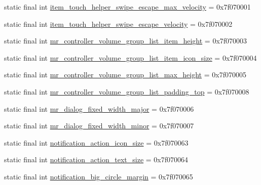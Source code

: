 \begin{CompactItemize}
\item 
static final int \hyperlink{classandroid_1_1support_1_1v7_1_1recyclerview_1_1_r_1_1dimen_744306f95c3c9e0ad3e85058a85fcd1d}{item\_\-touch\_\-helper\_\-swipe\_\-escape\_\-max\_\-velocity} = 0x7f070001
\item 
static final int \hyperlink{classandroid_1_1support_1_1v7_1_1recyclerview_1_1_r_1_1dimen_8ed36175a586aa30408abfcdcbc1035c}{item\_\-touch\_\-helper\_\-swipe\_\-escape\_\-velocity} = 0x7f070002
\item 
static final int \hyperlink{classandroid_1_1support_1_1v7_1_1recyclerview_1_1_r_1_1dimen_135923d4e9c0064c20acc7f8a604c40f}{mr\_\-controller\_\-volume\_\-group\_\-list\_\-item\_\-height} = 0x7f070003
\item 
static final int \hyperlink{classandroid_1_1support_1_1v7_1_1recyclerview_1_1_r_1_1dimen_bb6637b82221107026e5d4dd06da12c5}{mr\_\-controller\_\-volume\_\-group\_\-list\_\-item\_\-icon\_\-size} = 0x7f070004
\item 
static final int \hyperlink{classandroid_1_1support_1_1v7_1_1recyclerview_1_1_r_1_1dimen_b4adecf051fa3caccbf8f7ce49934896}{mr\_\-controller\_\-volume\_\-group\_\-list\_\-max\_\-height} = 0x7f070005
\item 
static final int \hyperlink{classandroid_1_1support_1_1v7_1_1recyclerview_1_1_r_1_1dimen_2ea464a5678737214271cbcf11b9e2cd}{mr\_\-controller\_\-volume\_\-group\_\-list\_\-padding\_\-top} = 0x7f070008
\item 
static final int \hyperlink{classandroid_1_1support_1_1v7_1_1recyclerview_1_1_r_1_1dimen_a5ed027adf71e112a79072f306959674}{mr\_\-dialog\_\-fixed\_\-width\_\-major} = 0x7f070006
\item 
static final int \hyperlink{classandroid_1_1support_1_1v7_1_1recyclerview_1_1_r_1_1dimen_413ba696ef469b13684d225484df5fdd}{mr\_\-dialog\_\-fixed\_\-width\_\-minor} = 0x7f070007
\item 
static final int \hyperlink{classandroid_1_1support_1_1v7_1_1recyclerview_1_1_r_1_1dimen_e432a51bc18ef5659c2fbca1c230b741}{notification\_\-action\_\-icon\_\-size} = 0x7f070063
\item 
static final int \hyperlink{classandroid_1_1support_1_1v7_1_1recyclerview_1_1_r_1_1dimen_66e1d8dfbe839fdbf4cac622b77d4e50}{notification\_\-action\_\-text\_\-size} = 0x7f070064
\item 
static final int \hyperlink{classandroid_1_1support_1_1v7_1_1recyclerview_1_1_r_1_1dimen_010c47da7fbaed16a5a49e44b7c79e6a}{notification\_\-big\_\-circle\_\-margin} = 0x7f070065
\item 

\end{CompactItemize}
